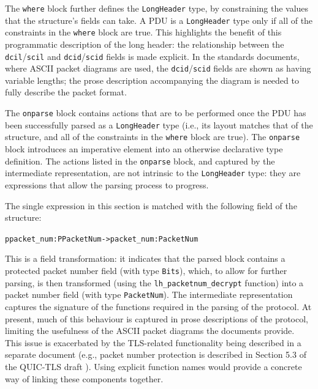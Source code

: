 \documentclass[10pt,sigconf]{acmart}
\begin{document}
The \texttt{where} block further defines the \texttt{LongHeader} type, by constraining the
values that the structure's fields can take. A PDU is a \texttt{LongHeader} type only if
all of the constraints in the \texttt{where} block are true. This highlights the benefit
of this programmatic description of the long header: the relationship
between the \texttt{dcil}/\texttt{scil} and \texttt{dcid}/\texttt{scid} fields is made
explicit. In the standards documents, where ASCII packet diagrams are used, the
\texttt{dcid}/\texttt{scid} fields are shown as having variable lengths; the prose
description accompanying the diagram is needed to fully describe the packet format.

The \texttt{onparse} block contains actions that are to be performed once the PDU has been
successfully parsed as a \texttt{LongHeader} type (i.e., its layout matches that of
the structure, and all of the constraints in the \texttt{where} block are true). The
\texttt{onparse} block introduces an imperative element into an otherwise declarative type
definition. The actions listed in the \texttt{onparse} block, and captured by the intermediate
representation, are not intrinsic to the \texttt{LongHeader} type: they are expressions that
allow the parsing process to progress.

The
single expression in this section is matched with the following field of the structure:
\footnotesize
\begin{alltt}
    ppacket_num : PPacketNum -> packet_num : PacketNum
\end{alltt}
\normalsize
This is a field transformation: it indicates that the parsed block
contains a protected packet number field (with type \texttt{Bits}), which, to allow
for further parsing, is then transformed (using the \texttt{lh\_packetnum\_decrypt} function)
into a packet number field (with type \texttt{PacketNum}). The intermediate
representation captures the signature of the functions required in the parsing of the
protocol. At present, much of this behaviour is captured in prose descriptions of the
protocol, limiting the usefulness of the ASCII packet diagrams the documents provide.
This issue is exacerbated by the TLS-related functionality being described in a separate
document (e.g., packet number protection is described in Section 5.3 of the
QUIC-TLS draft \cite{draft-ietf-quic-tls-14}). Using explicit function names would provide
a concrete way of linking these components together. 
\end{document}
